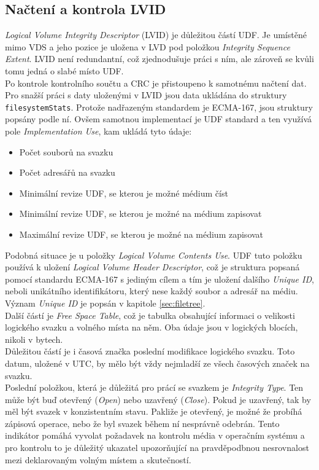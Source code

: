 \subsection{Načtení a kontrola LVID}
\label{sec:nacteni-a-kontrola-lvid}
\textit{Logical Volume Integrity Descriptor} (LVID) je důležitou částí UDF. Je umístěné mimo VDS a jeho pozice je uložena v LVD pod položkou \textit{Integrity Sequence Extent}. LVID není redundantní, což zjednodušuje práci s ním, ale zároveň se kvůli tomu jedná o slabé místo UDF.\\
Po kontrole kontrolního součtu a CRC je přistoupeno k samotnému načtení dat. Pro snažší práci s daty uloženými v LVID jsou data ukládána do struktury \texttt{filesystemStats}. Protože nadřazeným standardem je ECMA-167, jsou struktury popsány podle ní. Ovšem samotnou implementací je UDF standard a ten využívá pole \textit{Implementation Use}, kam ukládá tyto údaje:
\begin{itemize}
    \item Počet souborů na svazku
    \item Počet adresářů na svazku
    \item Minimální revize UDF, se kterou je možné médium číst
    \item Minimální revize UDF, se kterou je možné na médium zapisovat
    \item Maximální revize UDF, se kterou je možné na médium zapisovat
\end{itemize}
Podobná situace je u položky \textit{Logical Volume Contents Use}. UDF tuto položku používá k uložení \textit{Logical Volume Header Descriptor}, což je struktura popsaná pomocí standardu ECMA-167 s jediným cílem a tím je uložení dalšího \textit{Unique ID}, neboli unikátního identifikátoru, který nese každý soubor a adresář na médiu. Význam \textit{Unique ID} je popsán v kapitole \ref{sec:filetree}.\\
Další částí je \textit{Free Space Table}, což je tabulka obsahující informaci o velikosti logického svazku a volného místa na něm. Oba údaje jsou v logických blocích, nikoli v bytech.\\
Důležitou částí je i časová značka poslední modifikace logického svazku. Toto datum, uložené v UTC, by mělo být vždy nejmladší ze všech časových značek na svazku.\\
Poslední položkou, která je důležitá pro prácí se svazkem je \textit{Integrity Type}. Ten může být buď otevřený (\textit{Open}) nebo uzavřený (\textit{Close}). Pokud je uzavřený, tak by měl být svazek v konzistentním stavu. Pakliže je otevřený, je možné že probíhá zápisová operace, nebo že byl svazek během ní nesprávně odebrán. Tento indikátor pomáhá vyvolat požadavek na kontrolu média v operačním systému a pro kontrolu to je důležitý ukazatel upozorňující na pravděpodbnou nesrovnalost mezi deklarovaným volným místem a skutečností. 

